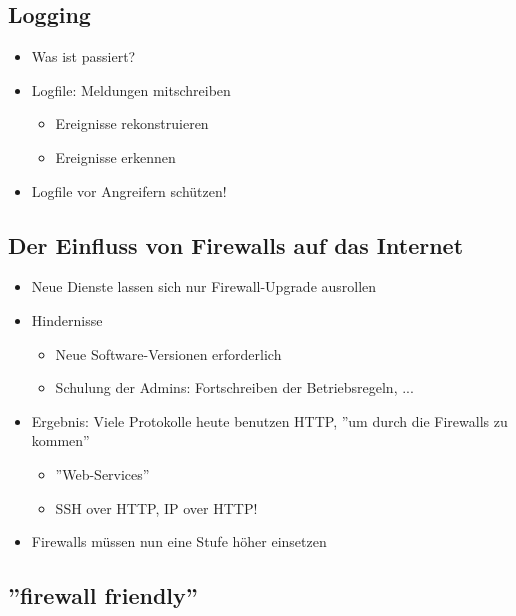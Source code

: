 \documentclass[openany]{book}
\begin{document}
\subsection{Logging}

\begin{itemize}
    \item Was ist passiert?
    \item Logfile: Meldungen mitschreiben
    \begin{itemize}
        \item Ereignisse rekonstruieren
        \item Ereignisse erkennen
    \end{itemize}
    \item Logfile vor Angreifern schützen!
\end{itemize}

\subsection{Der Einfluss von Firewalls auf das Internet}

\begin{itemize}
    \item Neue Dienste lassen sich nur Firewall-Upgrade ausrollen
    \item Hindernisse
    \begin{itemize}
        \item Neue Software-Versionen erforderlich
        \item Schulung der Admins: Fortschreiben der Betriebsregeln, ...
    \end{itemize}
    \item Ergebnis: Viele Protokolle heute benutzen HTTP, ''um durch die Firewalls zu kommen''
    \begin{itemize}
        \item ''Web-Services''
        \item SSH over HTTP, IP over HTTP!
    \end{itemize}
    \item Firewalls müssen nun eine Stufe höher einsetzen
\end{itemize}

\subsection{''firewall friendly''}
\end{document}

